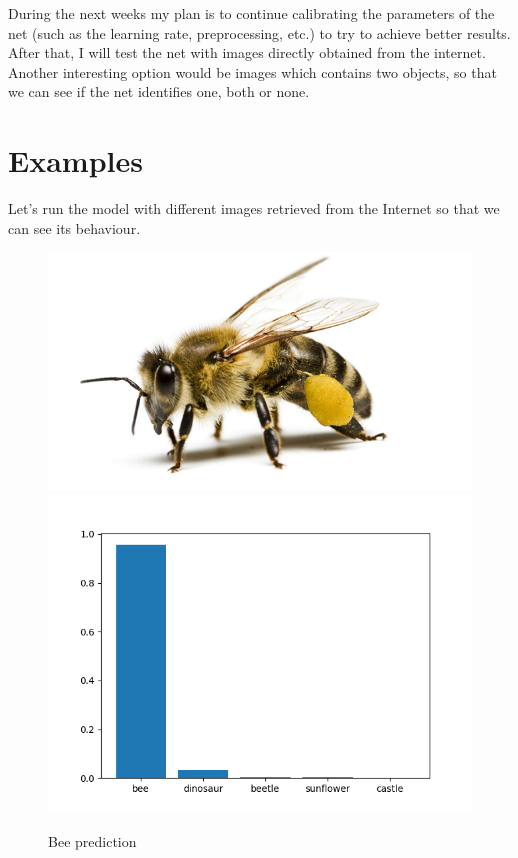 \documentclass[12pt,spanish]{article}
\begin{document}
During the next weeks my plan is to continue calibrating the parameters of the net (such as the learning rate, preprocessing, etc.) to try to achieve better results.\\

After that, I will test the net with images directly obtained from the internet. Another interesting option would be images which contains two objects, so that we can see if the net identifies one, both or none.

\section{Examples}
Let's run the model with different images retrieved from the Internet so that we can see its behaviour.

\begin{figure}[H]
\centering
\includegraphics[scale=0.27]{bee.png}
\includegraphics[scale=0.75]{bee_prediction.png}
\caption{Bee prediction}
\end{figure}
\end{document}
